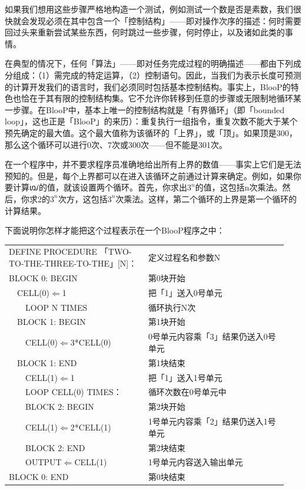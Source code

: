 \documentclass[
  12pt,
  twoside,
  openright,
  oldfontcommands,
]{memoir}
\begin{document}
如果我们想用这些步骤严格地构造一个测试，例如测试一个数是否是素数，我们很快就会发现必须在其中包含一个「控制结构」------即对操作次序的描述：何时需要回过头来重新尝试某些东西，何时跳过一些步骤，何时停止，以及诸如此类的事情。

在典型的情况下，任何「算法」------即对任务完成过程的明确描述------都由下列成分组成：（1）需完成的特定运算，（2）控制语句。因此，当我们为表示长度可预测的计算开发我们的语言时，我们必须同时包括基本控制结构。事实上，BlooP的特色也恰在于其有限的控制结构集。它不允许你转移到任意的步骤或无限制地循环某一步骤。在BlooP中，基本上唯一的控制结构就是「有界循环」（即「bounded
loop」，这也正是「BlooP」的来历）：重复执行一组指令，重复次数不能大于某个预先确定的最大值。这个最大值称为该循环的「上界」，或「顶」。如果顶是300，那么这个循环可以进行0次、7次或300次------但不能是301次。

在一个程序中，并不要求程序员准确地给出所有上界的数值------事实上它们是无法预知的。但是，每个上界都可以在进入该循环之前通过计算来确定。例如，如果你要计算{\gebfont ꪢ}的值，就该设置两个循环。首先，你求出$3^n$的值，这包括n次乘法。然后，你求2的$3^n$次方，这包括$3^n$次乘法。这样，第二个循环的上界是第一个循环的计算结果。

下面说明你怎样才能把这个过程表示在一个BlooP程序之中：

\begin{longtable}[]{>{\raggedright\arraybackslash}p{0.47\linewidth} >{\raggedright\arraybackslash}p{0.47\linewidth}}
\toprule\noalign{}
\endhead
\bottomrule\noalign{}
\endlastfoot
DEFINE PROCEDURE 「TWO-TO-THE-THREE-TO-THE」{[}N{]}： &
定义过程名和参数N \\
BLOCK 0: BEGIN & 第0块开始 \\
　CELL(0)$\Leftarrow$1 & 把「1」送入0号单元 \\
　　LOOP N TIMES & 循环执行N次 \\
　BLOCK 1: BEGIN & 第1块开始 \\
　　CELL(0)$\Leftarrow$3*CELL(0) & 0号单元内容乘「3」结果仍送入0号单元 \\
　BLOCK 1: END & 第1块结束 \\
　　CELL(1)$\Leftarrow$1 & 把「1」送入1号单元 \\
　　LOOP CELL(0) TIMES： & 循环次数在0号单元中 \\
　　BLOCK 2: BEGIN & 第2块开始 \\
　　CELL(1)$\Leftarrow$2*CELL(1) & 1号单元内容乘「2」结果仍送入1号单元 \\
　　BLOCK 2: END & 第2块结束 \\
　　OUTPUT$\Leftarrow$CELL(1) & 1号单元内容送入输出单元 \\
BLOCK 0: END & 第0块结束 \\
\end{longtable}
\end{document}
